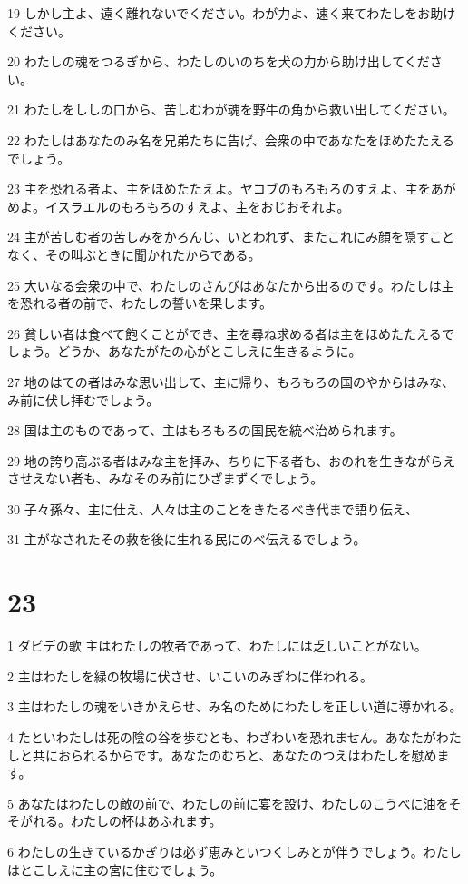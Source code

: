 \par 19 しかし主よ、遠く離れないでください。わが力よ、速く来てわたしをお助けください。
\par 20 わたしの魂をつるぎから、わたしのいのちを犬の力から助け出してください。
\par 21 わたしをししの口から、苦しむわが魂を野牛の角から救い出してください。
\par 22 わたしはあなたのみ名を兄弟たちに告げ、会衆の中であなたをほめたたえるでしょう。
\par 23 主を恐れる者よ、主をほめたたえよ。ヤコブのもろもろのすえよ、主をあがめよ。イスラエルのもろもろのすえよ、主をおじおそれよ。
\par 24 主が苦しむ者の苦しみをかろんじ、いとわれず、またこれにみ顔を隠すことなく、その叫ぶときに聞かれたからである。
\par 25 大いなる会衆の中で、わたしのさんびはあなたから出るのです。わたしは主を恐れる者の前で、わたしの誓いを果します。
\par 26 貧しい者は食べて飽くことができ、主を尋ね求める者は主をほめたたえるでしょう。どうか、あなたがたの心がとこしえに生きるように。
\par 27 地のはての者はみな思い出して、主に帰り、もろもろの国のやからはみな、み前に伏し拝むでしょう。
\par 28 国は主のものであって、主はもろもろの国民を統べ治められます。
\par 29 地の誇り高ぶる者はみな主を拝み、ちりに下る者も、おのれを生きながらえさせえない者も、みなそのみ前にひざまずくでしょう。
\par 30 子々孫々、主に仕え、人々は主のことをきたるべき代まで語り伝え、
\par 31 主がなされたその救を後に生れる民にのべ伝えるでしょう。

\chapter{23}

\par 1 ダビデの歌 主はわたしの牧者であって、わたしには乏しいことがない。
\par 2 主はわたしを緑の牧場に伏させ、いこいのみぎわに伴われる。
\par 3 主はわたしの魂をいきかえらせ、み名のためにわたしを正しい道に導かれる。
\par 4 たといわたしは死の陰の谷を歩むとも、わざわいを恐れません。あなたがわたしと共におられるからです。あなたのむちと、あなたのつえはわたしを慰めます。
\par 5 あなたはわたしの敵の前で、わたしの前に宴を設け、わたしのこうべに油をそそがれる。わたしの杯はあふれます。
\par 6 わたしの生きているかぎりは必ず恵みといつくしみとが伴うでしょう。わたしはとこしえに主の宮に住むでしょう。

